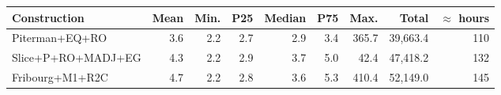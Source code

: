 \begin{tabular}{LrrrrrrRr}
  \hline
Construction & Mean & Min. & P25 & Median & P75 & Max. & Total & $\approx$ hours \\ 
  \hline
Piterman+EQ+RO & 3.6 & 2.2 & 2.7 & 2.9 & 3.4 & 365.7 & 39,663.4 & 110 \\ 
  Slice+P+RO+MADJ+EG & 4.3 & 2.2 & 2.9 & 3.7 & 5.0 & 42.4 & 47,418.2 & 132 \\ 
  Fribourg+M1+R2C & 4.7 & 2.2 & 2.8 & 3.6 & 5.3 & 410.4 & 52,149.0 & 145 \\ 
   \hline
\end{tabular}
